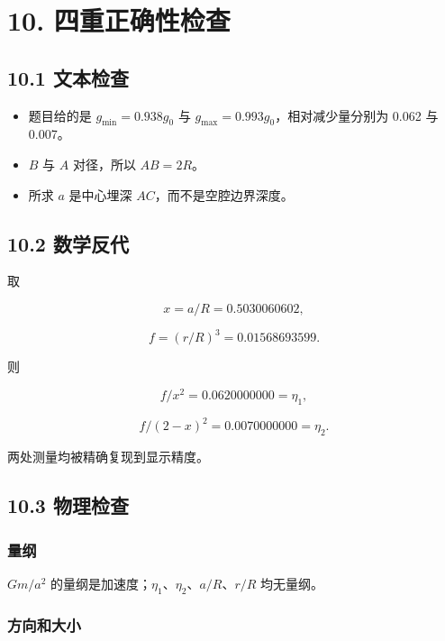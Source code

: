 \documentclass[
  11pt,
  UTF8]{ctexart}
\providecommand{\tightlist}{%
  \setlength{\itemsep}{0pt}\setlength{\parskip}{0pt}}
\begin{document}
\hypertarget{ux56dbux91cdux6b63ux786eux6027ux68c0ux67e5}{%
\section{10.
四重正确性检查}\label{ux56dbux91cdux6b63ux786eux6027ux68c0ux67e5}}

\hypertarget{ux6587ux672cux68c0ux67e5}{%
\subsection{10.1 文本检查}\label{ux6587ux672cux68c0ux67e5}}

\begin{itemize}
\tightlist
\item
  题目给的是 \(g_{\min}=0.938g_0\) 与
  \(g_{\max}=0.993g_0\)，相对减少量分别为 0.062 与 0.007。
\item
  \(B\) 与 \(A\) 对径，所以 \(AB=2R\)。
\item
  所求 \(a\) 是中心埋深 \(AC\)，而不是空腔边界深度。
\end{itemize}

\hypertarget{ux6570ux5b66ux53cdux4ee3}{%
\subsection{10.2 数学反代}\label{ux6570ux5b66ux53cdux4ee3}}

取

\[x=a/R=0.5030060602,\]

\[f=(r/R)^3=0.01568693599.\]

则

\[f/x^2=0.0620000000=η_1,\]

\[f/(2-x)^2=0.0070000000=η_2.\]

两处测量均被精确复现到显示精度。

\hypertarget{ux7269ux7406ux68c0ux67e5}{%
\subsection{10.3 物理检查}\label{ux7269ux7406ux68c0ux67e5}}

\hypertarget{ux91cfux7eb2}{%
\subsubsection{量纲}\label{ux91cfux7eb2}}

\(Gm/a^2\) 的量纲是加速度；\(η_1\)、\(η_2\)、\(a/R\)、\(r/R\) 均无量纲。

\hypertarget{ux65b9ux5411ux548cux5927ux5c0f}{%
\subsubsection{方向和大小}\label{ux65b9ux5411ux548cux5927ux5c0f}}
\end{document}
